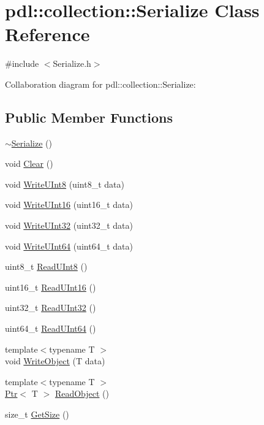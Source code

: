\hypertarget{classpdl_1_1collection_1_1_serialize}{}\section{pdl\+::collection\+::Serialize Class Reference}
\label{classpdl_1_1collection_1_1_serialize}


{\ttfamily \#include $<$Serialize.\+h$>$}



Collaboration diagram for pdl\+::collection\+::Serialize\+:
\subsection*{Public Member Functions}
\begin{DoxyCompactItemize}
\item 
\mbox{\hyperlink{classpdl_1_1collection_1_1_serialize_a4f6d989d69d62fbc73b7ed82473f564c}{$\sim$\+Serialize}} ()
\item 
void \mbox{\hyperlink{classpdl_1_1collection_1_1_serialize_a94131e5451258df6425175bf3459e497}{Clear}} ()
\item 
void \mbox{\hyperlink{classpdl_1_1collection_1_1_serialize_abebc864dfa0bce83d29910a92ebeb6e1}{Write\+U\+Int8}} (uint8\+\_\+t data)
\item 
void \mbox{\hyperlink{classpdl_1_1collection_1_1_serialize_ac76f034d09c8c2f9b5a9a914638e6f7a}{Write\+U\+Int16}} (uint16\+\_\+t data)
\item 
void \mbox{\hyperlink{classpdl_1_1collection_1_1_serialize_ad418de12818c5b913b04d6a992fc759c}{Write\+U\+Int32}} (uint32\+\_\+t data)
\item 
void \mbox{\hyperlink{classpdl_1_1collection_1_1_serialize_a278bf9c84f3a72908e7f5d685b00453b}{Write\+U\+Int64}} (uint64\+\_\+t data)
\item 
uint8\+\_\+t \mbox{\hyperlink{classpdl_1_1collection_1_1_serialize_a481c384a36cb7a64cbe986f4a3d624dc}{Read\+U\+Int8}} ()
\item 
uint16\+\_\+t \mbox{\hyperlink{classpdl_1_1collection_1_1_serialize_a54eff63fbd8e353490b4defb4c689d7b}{Read\+U\+Int16}} ()
\item 
uint32\+\_\+t \mbox{\hyperlink{classpdl_1_1collection_1_1_serialize_a86c77008290980ab5cfdd74ef97a61b9}{Read\+U\+Int32}} ()
\item 
uint64\+\_\+t \mbox{\hyperlink{classpdl_1_1collection_1_1_serialize_a2338f3af04ed253797f5474dcbc04038}{Read\+U\+Int64}} ()
\item 
{\footnotesize template$<$typename T $>$ }\\void \mbox{\hyperlink{classpdl_1_1collection_1_1_serialize_a4d5d93f03711777331eeabf92a8aa5a7}{Write\+Object}} (T data)
\item 
{\footnotesize template$<$typename T $>$ }\\\mbox{\hyperlink{classpdl_1_1memory_1_1_ptr}{Ptr}}$<$ T $>$ \mbox{\hyperlink{classpdl_1_1collection_1_1_serialize_a5ff418981c0e090860139c614a8eb54c}{Read\+Object}} ()
\item 
size\+\_\+t \mbox{\hyperlink{classpdl_1_1collection_1_1_serialize_a1c4a46d905ae7915cc28f2cfa9cb96c7}{Get\+Size}} ()
\end{DoxyCompactItemize}
